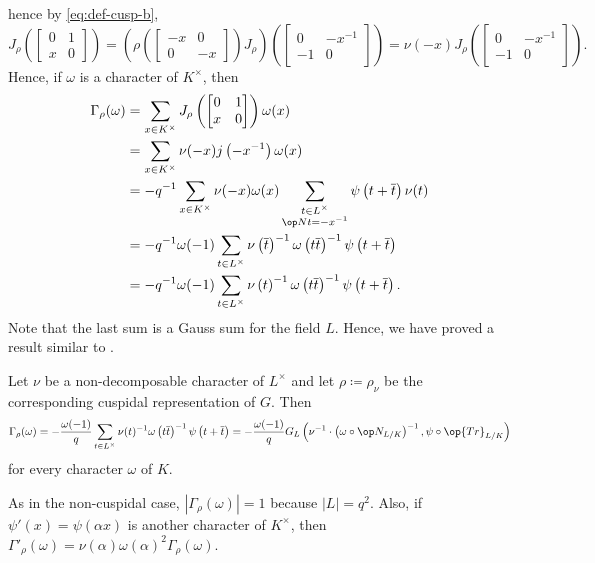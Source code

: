 \documentclass[../main.tex]{subfiles}
\begin{document}
hence by \eqref{eq:def-cusp-b},
\[J_\rho\left(\begin{bmatrix}
	0 & 1 \\
	x & 0
\end{bmatrix}\right)=\left(\rho\left(\begin{bmatrix}
	-x & 0 \\
	0 & -x
\end{bmatrix}\right)J_\rho\right)\left(\begin{bmatrix}
	0 & -x^{-1} \\
	-1 & 0
\end{bmatrix}\right)=\nu(-x)J_\rho\left(\begin{bmatrix}
	0 & -x^{-1} \\
	-1 & 0
\end{bmatrix}\right).\]
Hence, if $\omega$ is a character of $K^\times$, then
\begin{align*}
	\Gamma_\rho(\omega) &= \sum_{x\in K^\times}J_\rho\left(\begin{bmatrix}
		0 & 1 \\
		x & 0
	\end{bmatrix}\right)\omega(x) \\
	&= \sum_{x\in K^\times}\nu(-x)j\left(-x^{-1}\right)\omega(x) \\
	&= -q^{-1}\sum_{x\in K^\times}\nu(-x)\omega(x)\sum_{\substack{t\in L^\times\\\op Nt=-x^{-1}}}\psi\left(t+\overline t\right)\nu(t) \\
	&= -q^{-1}\omega(-1)\sum_{t\in L^\times}\nu\left(\overline t\right)^{-1}\omega\left(t\overline t\right)^{-1}\psi\left(t+\overline t\right) \\
	&= -q^{-1}\omega(-1)\sum_{t\in L^\times}\nu\left(t\right)^{-1}\omega\left(t\overline t\right)^{-1}\psi\left(t+\overline t\right).
\end{align*}
Note that the last sum is a Gauss sum for the field $L$. Hence, we have proved a result similar to .
\begin{theorem}
	Let $\nu$ be a non-decomposable character of $L^\times$ and let $\rho\coloneqq\rho_\nu$ be the corresponding cuspidal representation of $G$. Then
	\[\Gamma_\rho(\omega)=-\frac{\omega(-1)}q\sum_{t\in L^\times}\nu(t)^{-1}\omega\left(t\overline t\right)^{-1}\psi\left(t+\overline t\right)=-\frac{\omega(-1)}qG_L\left(\nu^{-1}\cdot\left(\omega\circ\op N_{L/K}\right)^{-1},\psi\circ\op{Tr}_{L/K}\right)\]
	for every character $\omega$ of $K$.
\end{theorem}
\begin{remark}
	As in the non-cuspidal case, $\left|\Gamma_\rho(\omega)\right|=1$ because $\left|L\right|=q^2$. Also, if $\psi'(x)=\psi(\alpha x)$ is another character of $K^\times$, then $\Gamma'_\rho(\omega)=\nu(\alpha)\omega(\alpha)^2\Gamma_\rho(\omega)$.
\end{remark}
\end{document}
